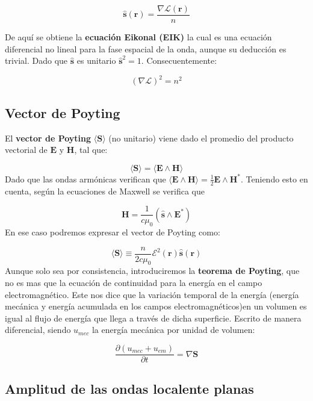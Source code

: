 \documentclass[12pt,a4paper]{book}
\numberwithin{equation}{section}
\numberwithin{figure}{section}
\newcommand{\parentesis}[1]{\left( #1  \right)}
\newcommand{\parciales}[2]{\frac{\partial #1}{\partial #2}}
\newcommand{\1}{_{(1)}}
\newcommand{\2}{_{(2)}}
\newcommand{\rn}{\mathbf{r}}
\newcommand{\sn}{\mathbf{s}}
\newcommand{\Sn}{\mathbf{S}}
\newcommand{\En}{\mathbf{E}}
\newcommand{\Hn}{\mathbf{H}}
\newcommand{\hns}{\hat{\sn}}
\theoremstyle{definition}
\begin{document}
\begin{equation}
\hns (\rn) = \dfrac{\nabla \mathcal{L} (\rn)}{n} \label{Ec:01.02.1-Poyting_unitario}
\end{equation}

De aquí se obtiene la \textbf{ecuación Eikonal (EIK)} la cual es una ecuación diferencial no lineal para la fase espacial de la onda, aunque su deducción es trivial. Dado que $\hns$ es unitario $\hns^2 =1$. Consecuentemente:

\begin{equation}
(\nabla \mathcal{L})^2 = n^2
\end{equation}

\subsection{Vector de Poyting}

El \textbf{vector de Poyting} $\langle \Sn \rangle$ (no unitario) viene dado el promedio del producto vectorial de $\En$ y $\Hn$, tal que:

\begin{equation}
\langle \Sn \rangle  = \langle \En \wedge \Hn \rangle
\end{equation}
Dado que las ondas armónicas verifican que $\langle \En \wedge \Hn \rangle = \frac{1}{2} \En \wedge \Hn^*$. Teniendo esto en cuenta, según la ecuaciones de Maxwell se verifica que

$$ \Hn = \dfrac{1}{c \mu_0} (\hns \wedge \En^* ) $$
En ese caso podremos expresar el vector de Poyting como:

\begin{equation}
\langle \Sn \rangle \equiv \dfrac{n}{2 c \mu_0} \mathcal{E}^2 (\rn) \hns  (\rn)
\end{equation}
Aunque solo sea por consistencia, introduciremos la \textbf{teorema de Poyting}, que no es mas que la ecuación de continuidad para la energía en el campo electromagnético. Este nos dice que la variación temporal de la energía (energía mecánica y energía acumulada en los campos electromagnéticos)en un volumen es igual al flujo de energía que llega a través de dicha superficie. Escrito de manera diferencial, siendo $u_{mec}$ la energía mecánica por unidad de volumen:

\begin{equation}
\parciales{ \parentesis{u_{mec} + u_{em}}}{t} = \nabla \Sn \label{Ec:01.01.4-Th-Poyting}
\end{equation} 


\subsection{Amplitud de las ondas localente planas}
\end{document}
